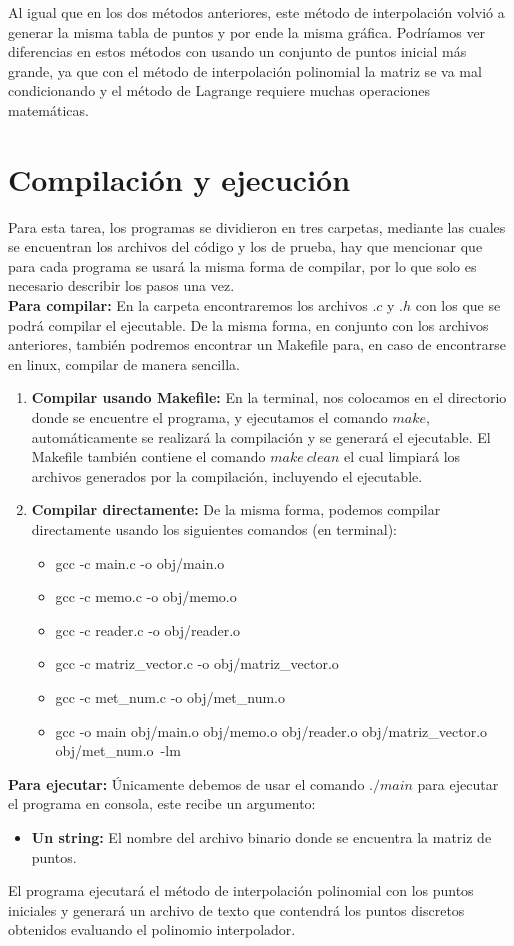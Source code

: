 \documentclass[12pt]{article}
\begin{document}
Al igual que en los dos métodos anteriores, este método de interpolación volvió a generar la misma tabla de puntos y por ende la misma gráfica.
Podríamos ver diferencias en estos métodos con usando un conjunto de puntos inicial más grande, ya que con el método de interpolación polinomial la matriz se va mal condicionando y el método de Lagrange requiere muchas operaciones matemáticas.

\section{Compilación y ejecución}
Para esta tarea, los programas se dividieron en tres carpetas, mediante las cuales se encuentran los archivos del código y los de prueba, hay que mencionar que para cada programa se usará la misma forma de compilar, por lo que solo es necesario describir los pasos una vez.\\

\textbf{Para compilar:} En la carpeta encontraremos los archivos $.c$ y $.h$ con los que se podrá compilar el ejecutable. De la misma forma, en conjunto con los archivos anteriores, también podremos encontrar un Makefile para, en caso de encontrarse en linux, compilar de manera sencilla.

\begin{enumerate}
	\item \textbf{Compilar usando Makefile:} En la terminal, nos colocamos en el directorio donde se encuentre el programa, y ejecutamos el comando $make$, automáticamente se realizará la compilación y se generará el ejecutable. El Makefile también contiene el comando $make\ clean$ el cual limpiará los archivos generados por la compilación, incluyendo el ejecutable.
	\item \textbf{Compilar directamente:} De la misma forma, podemos compilar directamente usando los siguientes comandos (en terminal):
	\begin{itemize}
		\item gcc -c main.c -o obj/main.o
		\item gcc -c memo.c -o obj/memo.o
		\item gcc -c reader.c -o obj/reader.o
		\item gcc -c matriz\_vector.c -o obj/matriz\_vector.o
		\item gcc -c met\_num.c -o obj/met\_num.o
		\item gcc -o main obj/main.o obj/memo.o obj/reader.o obj/matriz\_vector.o obj/met\_num.o\ -lm
	\end{itemize}
\end{enumerate}

\textbf{Para ejecutar:} Únicamente debemos de usar el comando $./main$ para ejecutar el programa en consola, este recibe un argumento:
\begin{itemize}
	\item \textbf{Un string:} El nombre del archivo binario donde se encuentra la matriz de puntos.
\end{itemize}

El programa ejecutará el método de interpolación polinomial con los puntos iniciales y generará un archivo de texto que contendrá los puntos discretos obtenidos evaluando el polinomio interpolador.
\end{document}
